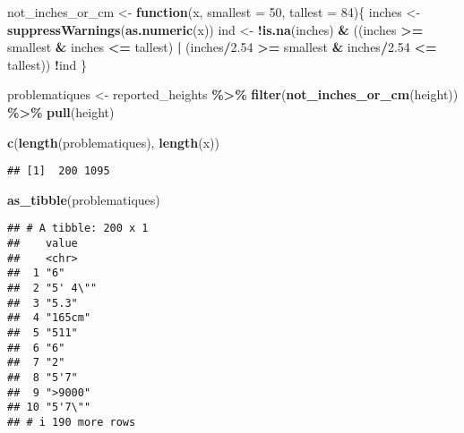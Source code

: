 \documentclass[
]{article}
\newenvironment{Shaded}{\begin{snugshade}}{\end{snugshade}}
\newcommand{\AttributeTok}[1]{\textcolor[rgb]{0.13,0.29,0.53}{#1}}
\newcommand{\ControlFlowTok}[1]{\textcolor[rgb]{0.13,0.29,0.53}{\textbf{#1}}}
\newcommand{\DecValTok}[1]{\textcolor[rgb]{0.00,0.00,0.81}{#1}}
\newcommand{\FloatTok}[1]{\textcolor[rgb]{0.00,0.00,0.81}{#1}}
\newcommand{\FunctionTok}[1]{\textcolor[rgb]{0.13,0.29,0.53}{\textbf{#1}}}
\newcommand{\NormalTok}[1]{#1}
\newcommand{\OtherTok}[1]{\textcolor[rgb]{0.56,0.35,0.01}{#1}}
\newcommand{\SpecialCharTok}[1]{\textcolor[rgb]{0.81,0.36,0.00}{\textbf{#1}}}
\begin{document}
\begin{Shaded}
\begin{Highlighting}[]
\NormalTok{not\_inches\_or\_cm }\OtherTok{\textless{}{-}} \ControlFlowTok{function}\NormalTok{(x, }\AttributeTok{smallest =} \DecValTok{50}\NormalTok{, }\AttributeTok{tallest =} \DecValTok{84}\NormalTok{)\{ }
\NormalTok{inches }\OtherTok{\textless{}{-}} \FunctionTok{suppressWarnings}\NormalTok{(}\FunctionTok{as.numeric}\NormalTok{(x))}
\NormalTok{ind }\OtherTok{\textless{}{-}} \SpecialCharTok{!}\FunctionTok{is.na}\NormalTok{(inches) }\SpecialCharTok{\&}\NormalTok{ ((inches }\SpecialCharTok{\textgreater{}=}\NormalTok{ smallest }\SpecialCharTok{\&}\NormalTok{ inches }\SpecialCharTok{\textless{}=}\NormalTok{ tallest) }\SpecialCharTok{|}\NormalTok{ (inches}\SpecialCharTok{/}\FloatTok{2.54} \SpecialCharTok{\textgreater{}=}\NormalTok{ smallest }\SpecialCharTok{\&}\NormalTok{ inches}\SpecialCharTok{/}\FloatTok{2.54} \SpecialCharTok{\textless{}=}\NormalTok{ tallest))}
\SpecialCharTok{!}\NormalTok{ind \}}

\NormalTok{problematiques }\OtherTok{\textless{}{-}}\NormalTok{ reported\_heights }\SpecialCharTok{\%\textgreater{}\%} \FunctionTok{filter}\NormalTok{(}\FunctionTok{not\_inches\_or\_cm}\NormalTok{(height)) }\SpecialCharTok{\%\textgreater{}\%} \FunctionTok{pull}\NormalTok{(height)}
\end{Highlighting}
\end{Shaded}

\begin{Shaded}
\begin{Highlighting}[]
\FunctionTok{c}\NormalTok{(}\FunctionTok{length}\NormalTok{(problematiques), }\FunctionTok{length}\NormalTok{(x))}
\end{Highlighting}
\end{Shaded}

\begin{verbatim}
## [1]  200 1095
\end{verbatim}

\begin{Shaded}
\begin{Highlighting}[]
\FunctionTok{as\_tibble}\NormalTok{(problematiques)}
\end{Highlighting}
\end{Shaded}

\begin{verbatim}
## # A tibble: 200 x 1
##    value   
##    <chr>   
##  1 "6"     
##  2 "5' 4\""
##  3 "5.3"   
##  4 "165cm" 
##  5 "511"   
##  6 "6"     
##  7 "2"     
##  8 "5'7"   
##  9 ">9000" 
## 10 "5'7\"" 
## # i 190 more rows
\end{verbatim}
\end{document}
